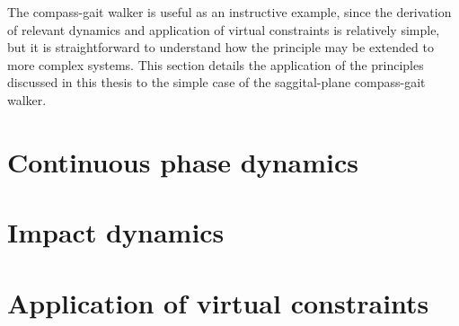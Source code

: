 The compass-gait walker is useful as an instructive example, since the derivation of relevant dynamics and application of virtual constraints is relatively simple, but it is straightforward to understand how the principle may be extended to more complex systems. This section details the application of the principles discussed in this thesis to the simple case of the saggital-plane compass-gait walker.

\section{Continuous phase dynamics}


\section{Impact dynamics}


\section{Application of virtual constraints}
